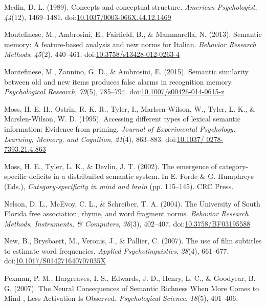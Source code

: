 \documentclass[english,,man]{apa6}
\theoremstyle{definition}
\theoremstyle{definition}
\theoremstyle{definition}
\theoremstyle{remark}
\begin{document}
\hypertarget{ref-Medin1989}{}
Medin, D. L. (1989). Concepts and conceptual structure. \emph{American
Psychologist}, \emph{44}(12), 1469--1481.
doi:\href{https://doi.org/10.1037/0003-066X.44.12.1469}{10.1037/0003-066X.44.12.1469}

\hypertarget{ref-Montefinese2013}{}
Montefinese, M., Ambrosini, E., Fairfield, B., \& Mammarella, N. (2013).
Semantic memory: A feature-based analysis and new norms for Italian.
\emph{Behavior Research Methods}, \emph{45}(2), 440--461.
doi:\href{https://doi.org/10.3758/s13428-012-0263-4}{10.3758/s13428-012-0263-4}

\hypertarget{ref-Montefinese2015}{}
Montefinese, M., Zannino, G. D., \& Ambrosini, E. (2015). Semantic
similarity between old and new items produces false alarms in
recognition memory. \emph{Psychological Research}, \emph{79}(5),
785--794.
doi:\href{https://doi.org/10.1007/s00426-014-0615-z}{10.1007/s00426-014-0615-z}

\hypertarget{ref-Moss1995}{}
Moss, H. E. H., Ostrin, R. K. R., Tyler, I., Marlsen-Wilson, W., Tyler,
L. K., \& Marslen-Wilson, W. D. (1995). Accessing different types of
lexical semantic information: Evidence from priming. \emph{Journal of
Experimental Psychology: Learning, Memory, and Cognition}, \emph{21}(4),
863--883.
doi:\href{https://doi.org/10.1037/\%200278-7393.21.4.863}{10.1037/ 0278-7393.21.4.863}

\hypertarget{ref-Moss2002}{}
Moss, H. E., Tyler, L. K., \& Devlin, J. T. (2002). The emergence of
category-specific deficits in a distribuited semantic system. In E.
Forde \& G. Humphreys (Eds.), \emph{Category-specificity in mind and
brain} (pp. 115--145). CRC Press.

\hypertarget{ref-Nelson2004}{}
Nelson, D. L., McEvoy, C. L., \& Schreiber, T. A. (2004). The University
of South Florida free association, rhyme, and word fragment norms.
\emph{Behavior Research Methods, Instruments, \& Computers},
\emph{36}(3), 402--407.
doi:\href{https://doi.org/10.3758/BF03195588}{10.3758/BF03195588}

\hypertarget{ref-New2007}{}
New, B., Brysbaert, M., Veronis, J., \& Pallier, C. (2007). The use of
film subtitles to estimate word frequencies. \emph{Applied
Psycholinguistics}, \emph{28}(4), 661--677.
doi:\href{https://doi.org/10.1017/S014271640707035X}{10.1017/S014271640707035X}

\hypertarget{ref-Pexman2007}{}
Pexman, P. M., Hargreaves, I. S., Edwards, J. D., Henry, L. C., \&
Goodyear, B. G. (2007). The Neural Consequences of Semantic Richness
When More Comes to Mind , Less Activation Is Observed.
\emph{Psychological Science}, \emph{18}(5), 401--406.
\end{document}
